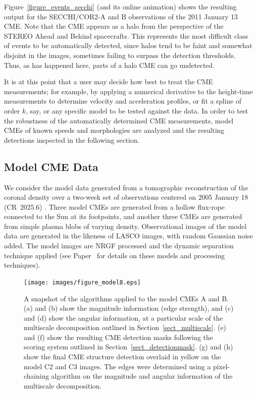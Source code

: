 \documentclass[preprint2]{aastex}
\newcommand{\RNum}[1]{\uppercase\expandafter{\romannumeral #1\relax}}
\begin{document}
Figure~\ref{figure_events_secchi} (and its online animation) shows the resulting output for the SECCHI/COR2-A and B observations of the 2011 January 13 CME. Note that the CME appears as a halo from the perspective of the STEREO Ahead and Behind spacecrafts. This represents the most difficult class of events to be automatically detected, since halos tend to be faint and somewhat disjoint in the images, sometimes failing to surpass the detection thresholds. Thus, as has happened here, parts of a halo CME can go undetected.

It is at this point that a user may decide how best to treat the CME measurements; for example, by applying a numerical derivative to the height-time measurements to determine velocity and acceleration profiles, or fit a spline of order $k$, say, or any specific model to be tested against the data. In order to test the robustness of the automatically determined CME measurements, model CMEs of known speeds and morphologies are analyzed and the resulting detections inspected in the following section.


\subsection{Model CME Data}

We consider the model data generated from a tomographic reconstruction of the coronal density over a two-week set of observations centered on 2005 January 18 (CR~2025.6) \citep{2009ApJ...690.1119M}. Three model CMEs are generated from a hollow flux-rope connected to the Sun at its footpoints, and another three CMEs are generated from simple plasma blobs of varying density. Observational images of the model data are generated in the likeness of LASCO images, with random Gaussian noise added. The model images are NRGF processed and the dynamic separation technique applied (see Paper~\RNum{1} for details on these models and processing techniques).

\begin{figure}[!t]
\centerline{\texttt{[image: images/figure\_model8.eps]}}
\caption{A snapshot of the algorithms applied to the model CMEs A and B. (a) and (b) show the magnitude information (edge strength), and (c) and (d) show the angular information, at a particular scale of the multiscale decomposition outlined in Section~\ref{sect_multiscale}. (e) and (f) show the resulting CME detection masks following the scoring system outlined in Section~\ref{sect_detectionmask}. (g) and (h) show the final CME structure detection overlaid in yellow on the model C2 and C3 images. The edges were determined using a pixel-chaining algorithm on the magnitude and angular information of the multiscale decomposition.}
\label{figure_model8}
\end{figure}
\end{document}
